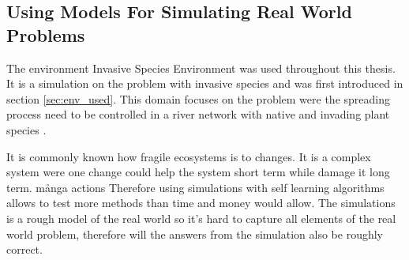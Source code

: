 \subsection{Using Models For Simulating Real World Problems }
\label{sec:ethics_inv_spec}


The environment Invasive Species Environment was used throughout this thesis. It is a simulation on the problem with invasive species and was first introduced in section \ref{sec:env_used}. This domain focuses on the problem were the spreading process need to be controlled in a river network with native and invading plant species \parencite{invasiveSpecis2014:Online}. 





It is commonly known how fragile ecosystems is to changes. It is a complex system were one change could help the system short term while damage it long term. många actions Therefore using simulations with self learning algorithms allows to test more methods than time and money would allow. The simulations is a rough model of the real world so it's hard to capture all elements of the real world problem, therefore will the answers from the simulation also be roughly correct.

